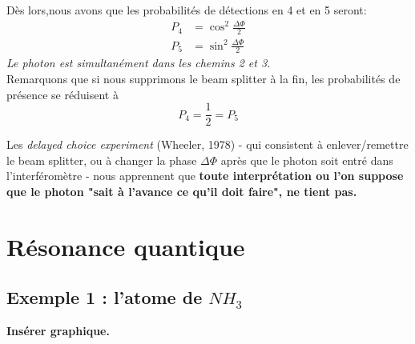\documentclass[../notesdecours.tex]{subfiles}
\begin{document}
Dès lors,nous avons que les probabilités de détections en 4 et en 5 seront:
\begin{align}
    P_4 &= \cos^2 \frac{\Delta \Phi}{2}\\
    P_5 &= \sin^2 \frac{\Delta \Phi}{2}
\end{align}
\emph{Le photon est simultanément dans les chemins 2 et 3.}\\

Remarquons que si nous supprimons le beam splitter à la fin, les probabilités de présence se réduisent à
\begin{equation}
    P_4 = \frac{1}{2} = P_5
\end{equation}

Les \emph{delayed choice experiment} (Wheeler, 1978) - qui consistent à enlever/remettre le beam splitter, ou à changer la phase $\Delta\Phi$ après que le photon soit entré dans l'interféromètre - nous apprennent que \textbf{toute interprétation ou l'on suppose que le photon "sait à l'avance ce qu'il doit faire", ne tient pas.}



\section{Résonance quantique}

\subsection{Exemple 1 : l'atome de $NH_3$}

\color{red} \textbf{Insérer graphique.} \color{black}
\end{document}
